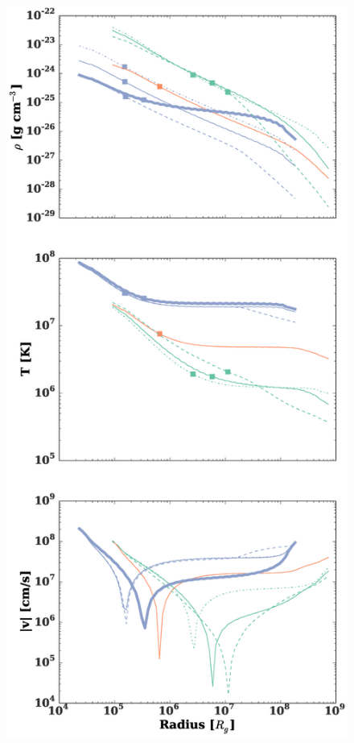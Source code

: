 \documentclass[usenatbib,fleqn]{mn2e}
\begin{document}

\begin{figure}
  \includegraphics[width=\columnwidth]{profiles.eps}

\end{figure}
\end{document}
